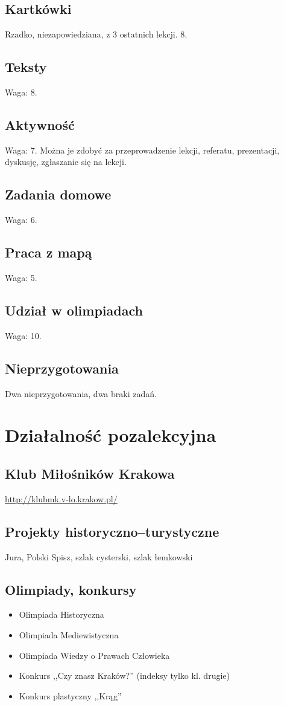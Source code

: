 \documentclass [a4paper, 11pt, oneside]{book}
\begin{document}
    \subsection{Kartkówki}
        Rzadko, niezapowiedziana, z 3 ostatnich lekcji. 8.
    \subsection{Teksty}
        Waga: 8.
    \subsection{Aktywność}
        Waga: 7. Można je zdobyć za przeprowadzenie lekcji, referatu, prezentacji, dyskusję, zgłaszanie się na lekcji.
    \subsection{Zadania domowe}
        Waga: 6.
    \subsection{Praca z mapą}
        Waga: 5.
    \subsection{Udział w olimpiadach}
        Waga: 10.
    \subsection{Nieprzygotowania}
        Dwa nieprzygotowania, dwa braki zadań.
\section{Działalność pozalekcyjna}
    \subsection{Klub Miłośników Krakowa}
        \href{http://klubmk.v-lo.krakow.pl/}{http://klubmk.v-lo.krakow.pl/}
    \subsection{Projekty historyczno--turystyczne}
        Jura, Polski Spisz, szlak cysterski, szlak łemkowski
    \subsection{Olimpiady, konkursy}
        \begin{itemize}
            \item Olimpiada Historyczna
            \item Olimpiada Mediewistyczna
            \item Olimpiada Wiedzy o Prawach Człowieka
            \item Konkurs ,,Czy znasz Kraków?'' (indeksy tylko kl. drugie)
            \item Konkurs plastyczny ,,Krąg''
        \end{itemize}
\end{document}
